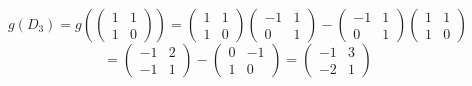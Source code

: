 \documentclass[a4paper]{article}
\theoremstyle{break}
\theoremstyle{break}
\theoremstyle{break}
\theoremstyle{break}
\begin{document}
\begin{enumerate}
        \vspace{2em}
        \[
        g(D_3) = g \left( \begin{pmatrix} 1 & 1\\1 & 0 \end{pmatrix} \right) =
        \begin{pmatrix} 
          1 & 1\\
          1 & 0
        \end{pmatrix}
        \begin{pmatrix} 
          -1 & 1\\
          0 & 1
        \end{pmatrix}
        -
        \begin{pmatrix} 
          -1 & 1\\
          0 & 1
        \end{pmatrix}
        \begin{pmatrix} 
          1 & 1\\
          1 & 0
        \end{pmatrix}
        \]
        \[
        = \begin{pmatrix} 
          -1 & 2\\
          -1 & 1
        \end{pmatrix} 
        -
        \begin{pmatrix} 
          0 & -1\\
          1 & 0
        \end{pmatrix} 
        =
        \begin{pmatrix} 
          -1 & 3\\
          -2 & 1
        \end{pmatrix} 
        \] 


\end{enumerate}
\end{document}
